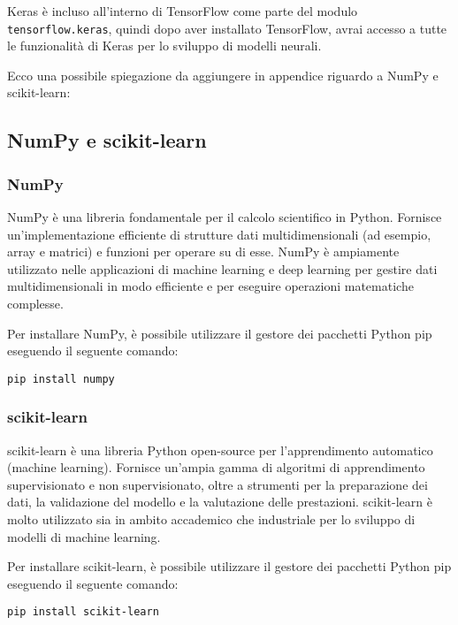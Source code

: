 \documentclass{article}
\begin{document}
Keras è incluso all'interno di TensorFlow come parte del modulo \texttt{tensorflow.keras}, quindi dopo aver installato TensorFlow, avrai accesso a tutte le funzionalità di Keras per lo sviluppo di modelli neurali.


Ecco una possibile spiegazione da aggiungere in appendice riguardo a NumPy e scikit-learn:

\subsection{NumPy e scikit-learn}

\subsubsection{NumPy}

NumPy è una libreria fondamentale per il calcolo scientifico in Python. Fornisce un'implementazione efficiente di strutture dati multidimensionali (ad esempio, array e matrici) e funzioni per operare su di esse. NumPy è ampiamente utilizzato nelle applicazioni di machine learning e deep learning per gestire dati multidimensionali in modo efficiente e per eseguire operazioni matematiche complesse.

Per installare NumPy, è possibile utilizzare il gestore dei pacchetti Python pip eseguendo il seguente comando:

\begin{verbatim}
pip install numpy
\end{verbatim}

\subsubsection{scikit-learn}

scikit-learn è una libreria Python open-source per l'apprendimento automatico (machine learning). Fornisce un'ampia gamma di algoritmi di apprendimento supervisionato e non supervisionato, oltre a strumenti per la preparazione dei dati, la validazione del modello e la valutazione delle prestazioni. scikit-learn è molto utilizzato sia in ambito accademico che industriale per lo sviluppo di modelli di machine learning.

Per installare scikit-learn, è possibile utilizzare il gestore dei pacchetti Python pip eseguendo il seguente comando:

\begin{verbatim}
pip install scikit-learn
\end{verbatim}
\end{document}
